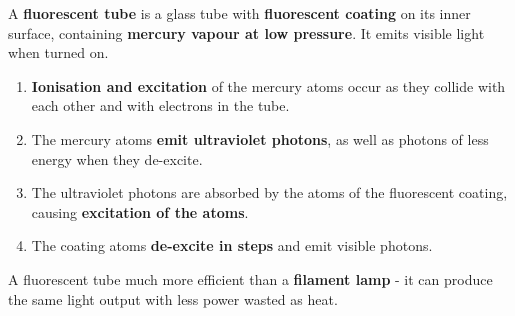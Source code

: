 A \textbf{fluorescent tube} is a glass tube with \textbf{fluorescent coating} on its inner surface, containing \textbf{mercury vapour at low pressure}. It emits visible light when turned on.
\begin{enumerate}
    \item \textbf{Ionisation and excitation} of the mercury atoms occur as they collide with each other and with electrons in the tube.
    \item The mercury atoms \textbf{emit ultraviolet photons}, as well as photons of less energy when they de-excite.
    \item The ultraviolet photons are absorbed by the atoms of the fluorescent coating, causing \textbf{excitation of the atoms}.
    \item The coating atoms \textbf{de-excite in steps} and emit visible photons.
\end{enumerate}
A fluorescent tube much more efficient than a \textbf{filament lamp} - it can produce the same light output with less power wasted as heat.
